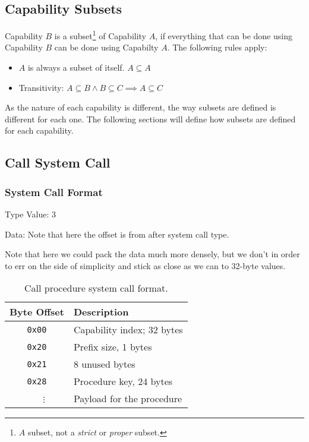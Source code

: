 \documentclass[english,a4paper]{article}
\let\oldparagraph\subsubsection
\renewcommand{\subsubsection}[1]{\oldparagraph{#1}\mbox{}}
\begin{document}
\subsection{Capability Subsets}\label{cap-subsets}

Capability $B$ is a subset\footnote{$A$ subset, not a \emph{strict} or
\emph{proper} subset.} of Capability $A$, if everything that can be done using
Capability $B$ can be done using Capabilty $A$. The following rules apply:

\begin{itemize}
  \item $A$ is always a subset of itself. $A \subseteq A$
  \item Transitivity: $A \subseteq B \land B \subseteq C \implies A
  \subseteq C$
\end{itemize}

As the nature of each capability is different, the way subsets are defined is
different for each one. The following sections will define how subsets are
defined for each capability.

\subsection{Call System Call}

\subsubsection{System Call Format}
Type Value: 3

Data: Note that here the offset is from after system call type.

Note that here we could pack the data much more densely, but we don't in order
to err on the side of simplicity and stick as close as we can to 32-byte values.

\begin{table}[H]
  \caption{Call procedure system call format.}
  \centering{}%
  \begin{tabularx}{\textwidth}{c|X}
    \hline
    Byte Offset & Description \\
    \hline
    \hline
    \texttt{0x00} & Capability index; 32 bytes \\
    \texttt{0x20} & Prefix size, 1 bytes \\
    \texttt{0x21} & 8 unused bytes \\
    \texttt{0x28} & Procedure key, 24 bytes \\
    ~~~$\vdots$ & Payload for the procedure \\
    \hline
  \end{tabularx}
\end{table}
\end{document}
